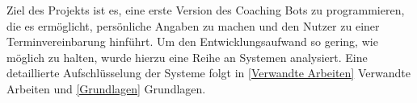     Ziel des Projekts ist es, eine erste Version des Coaching Bots zu programmieren, die es ermöglicht, persönliche Angaben zu machen und den Nutzer zu einer Terminvereinbarung hinführt. Um den Entwicklungsaufwand so gering, wie möglich zu halten, wurde hierzu eine Reihe an Systemen analysiert. Eine detaillierte Aufschlüsselung der Systeme folgt in \ref{Verwandte Arbeiten} Verwandte Arbeiten und \ref{Grundlagen} Grundlagen.




